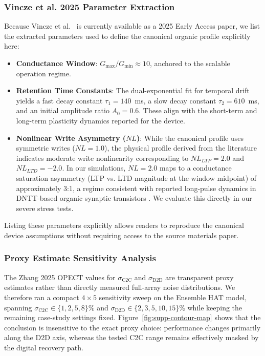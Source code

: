 \FloatBarrier

\subsubsection{Vincze et al. 2025 Parameter Extraction}

Because Vincze et al.\ \citep{vincze2026dualplasticity} is currently available as a 2025 Early Access paper, we list the extracted parameters used to define the canonical organic profile explicitly here:

\begin{itemize}
    \item \textbf{Conductance Window}: $G_{\max}/G_{\min} \approx 10$, anchored to the scalable operation regime.
    \item \textbf{Retention Time Constants}: The dual-exponential fit for temporal drift yields a fast decay constant $\tau_1 = 140$~ms, a slow decay constant $\tau_2 = 610$~ms, and an initial amplitude ratio $A_0 = 0.6$. These align with the short-term and long-term plasticity dynamics reported for the device.
    \item \textbf{Nonlinear Write Asymmetry ($NL$)}: While the canonical profile uses symmetric writes ($NL=1.0$), the physical profile derived from the literature indicates moderate write nonlinearity corresponding to $NL_{LTP} = 2.0$ and $NL_{LTD} = -2.0$. In our simulations, $NL=2.0$ maps to a conductance saturation asymmetry (LTP vs. LTD magnitude at the window midpoint) of approximately 3:1, a regime consistent with reported long-pulse dynamics in DNTT-based organic synaptic transistors \citep{vincze2026dualplasticity}. We evaluate this directly in our severe stress tests.
\end{itemize}

Listing these parameters explicitly allows readers to reproduce the canonical device assumptions without requiring access to the source materials paper.

\subsubsection{Proxy Estimate Sensitivity Analysis}

The Zhang 2025 OPECT values for \(\sigma_{\mathrm{C2C}}\) and \(\sigma_{\mathrm{D2D}}\) are transparent proxy estimates rather than directly measured full-array noise distributions. We therefore ran a compact \(4 \times 5\) sensitivity sweep on the Ensemble HAT model, spanning \(\sigma_{\mathrm{C2C}} \in \{1, 2, 5, 8\}\%\) and \(\sigma_{\mathrm{D2D}} \in \{2, 3, 5, 10, 15\}\%\) while keeping the remaining case-study settings fixed. Figure~\ref{fig:supp-contour-map} shows that the conclusion is insensitive to the exact proxy choice: performance changes primarily along the D2D axis, whereas the tested C2C range remains effectively masked by the digital recovery path.

